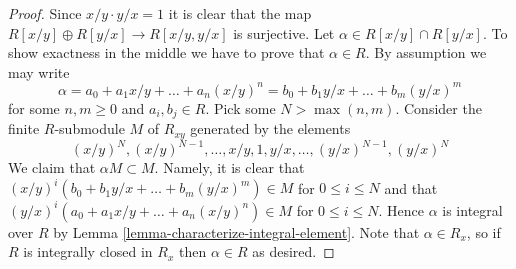 \begin{proof}
Since $x/y \cdot y/x = 1$ it is clear that the map
$R[x/y] \oplus R[y/x] \to R[x/y, y/x]$ is surjective.
Let $\alpha \in R[x/y] \cap R[y/x]$. To show exactness in the middle
we have to prove that $\alpha \in R$. By assumption we may write
$$
\alpha = a_0 + a_1 x/y + \ldots + a_n (x/y)^n =
b_0 + b_1 y/x + \ldots + b_m(y/x)^m
$$
for some $n, m \geq 0$ and $a_i, b_j \in R$.
Pick some $N > \max(n, m)$.
Consider the finite $R$-submodule $M$ of $R_{xy}$ generated by the elements
$$
(x/y)^N, (x/y)^{N - 1}, \ldots, x/y, 1, y/x, \ldots, (y/x)^{N - 1}, (y/x)^N
$$
We claim that $\alpha M \subset M$. Namely, it is clear that
$(x/y)^i (b_0 + b_1 y/x + \ldots + b_m(y/x)^m) \in M$ for
$0 \leq i \leq N$ and that
$(y/x)^i (a_0 + a_1 x/y + \ldots + a_n(x/y)^n) \in M$ for
$0 \leq i \leq N$. Hence $\alpha$ is integral over $R$ by
Lemma \ref{lemma-characterize-integral-element}. Note that
$\alpha \in R_x$, so if $R$ is integrally closed in $R_x$
then $\alpha \in R$ as desired.
\end{proof}














